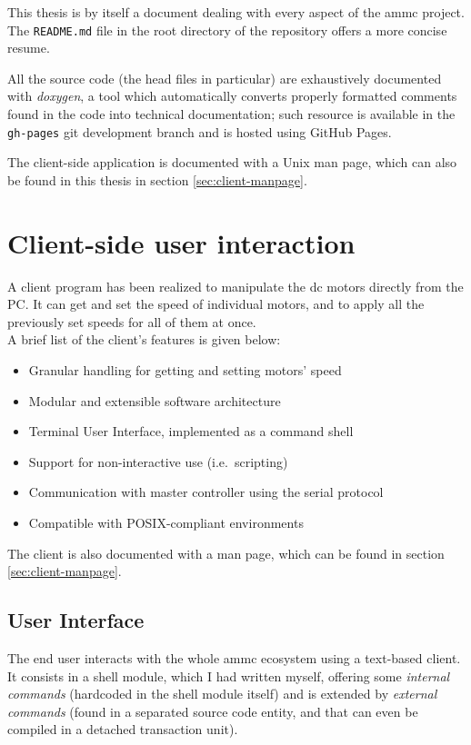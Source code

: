 \documentclass[binding=0.6cm,Lau]{sapthesis}
\begin{document}
This thesis is by itself a document dealing with every aspect of the ammc
project. The \texttt{README.md} file in the root directory of the repository
offers a more concise resume.

All the source code (the head files in particular) are exhaustively documented
with \emph{doxygen}, a tool which automatically converts properly formatted
comments found in the code into technical documentation; such resource is
available in the \texttt{gh-pages} git development branch and is hosted using
GitHub Pages.

The client-side application is documented with a Unix man page, which can also
be found in this thesis in section \ref{sec:client-manpage}.


\chapter{Client-side user interaction}
\label{ch:client}
A client program has been realized to manipulate the dc motors directly from the
PC. It can get and set the speed of individual motors, and to apply all the
previously set speeds for all of them at once.\\ A brief list of the
client's features is given below:
\begin{itemize}
  \item Granular handling for getting and setting motors' speed
  \item Modular and extensible software architecture
  \item Terminal User Interface, implemented as a command shell
  \item Support for non-interactive use (i.e.\ scripting)
  \item Communication with master controller using the serial protocol
  \item Compatible with POSIX-compliant environments
\end{itemize}
The client is also documented with a man page, which can be found in section
\ref{sec:client-manpage}.

\section{User Interface}
The end user interacts with the whole ammc ecosystem using a text-based client.
It consists in a shell module, which I had written myself, offering some
\emph{internal commands} (hardcoded in the shell module itself) and is extended
by \emph{external commands} (found in a separated source code entity, and that
can even be compiled in a detached transaction unit).
\end{document}
